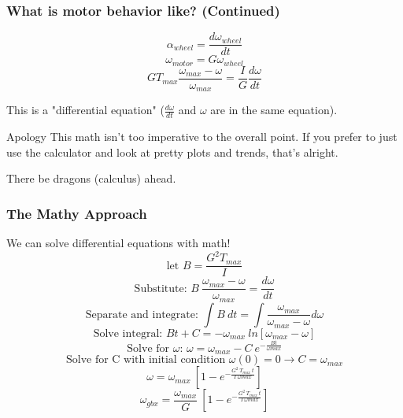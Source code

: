 \documentclass{beamer}%
\begin{document}
\begin{frame}
	\frametitle{What is motor behavior like? (Continued)}
	\begin{equation}
		\alpha_{wheel} = \frac{d \omega_{wheel}}{dt}
	\end{equation}\begin{equation}
		\omega_{motor} = G \omega_{wheel}
	\end{equation}\begin{equation}
		G T_{max} \frac{\omega_{max} - \omega}{\omega_{max}} = \frac{I}{G} \frac{d \omega}{dt}
	\end{equation}
	
		This is a "differential equation" ($\frac{d \omega}{dt}$ and $\omega$ are in the same equation).	
	
	\begin{alertblock}{Apology}
		This math isn't too imperative to the overall point. If you prefer to just use the calculator and look at pretty plots and trends, that's alright.
		
		There be dragons (calculus) ahead.
	\end{alertblock}	
	
\end{frame}

\begin{frame}
	\frametitle{The Mathy Approach}
	
	We can solve differential equations with math!	
	\begin{equation}
		\mbox{let } B = \frac{G^2 T_{max}}{I}
	\end{equation}\begin{equation}
		\mbox{Substitute: } B\ \frac{\omega_{max} - \omega}{\omega_{max}} = \frac{d \omega}{d t}
	\end{equation}\begin{equation}
		\mbox{Separate and integrate: } \int B\ dt = \int \frac{\omega_{max}}{\omega_{max} - \omega} d \omega
	\end{equation}\begin{equation}
		\mbox{Solve integral: } B t + C = -\omega_{max}\ ln[\omega_{max} - \omega]
	\end{equation}\begin{equation}
		\mbox{Solve for $\omega$: } \omega = \omega_{max} - C\ e^{-\frac{B t}{\omega{max}}}
	\end{equation}\begin{equation}
		\mbox{Solve for C with initial condition } \omega(0) = 0 \rightarrow C = \omega_{max}
	\end{equation}\begin{equation}
		\omega = \omega_{max}\ [1 - e^{-\frac{G^2\ T_{max}\ t}{I\ \omega{max}}}]
	\end{equation}\begin{equation}
		\omega_{gbx} = \frac{\omega_{max}}{G}\ [1 - e^{-\frac{G^2\ T_{max}\ t}{I\ \omega{max}}}]
	\end{equation}
\end{frame}
\end{document}
